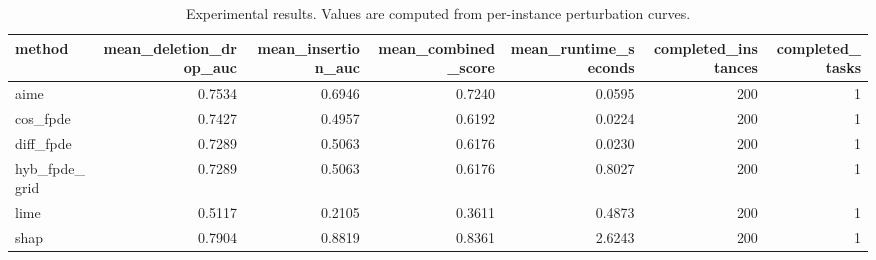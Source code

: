 \begin{table}[t]
\caption{Experimental results. Values are computed from per-instance perturbation curves.}
\label{tab:main_results_computed}
\centering
\begin{tabular}{lrrrrrr}
\toprule
method & mean\_deletion\_drop\_auc & mean\_insertion\_auc & mean\_combined\_score & mean\_runtime\_seconds & completed\_instances & completed\_tasks \\
\midrule
aime & 0.7534 & 0.6946 & 0.7240 & 0.0595 & 200 & 1 \\
cos\_fpde & 0.7427 & 0.4957 & 0.6192 & 0.0224 & 200 & 1 \\
diff\_fpde & 0.7289 & 0.5063 & 0.6176 & 0.0230 & 200 & 1 \\
hyb\_fpde\_grid & 0.7289 & 0.5063 & 0.6176 & 0.8027 & 200 & 1 \\
lime & 0.5117 & 0.2105 & 0.3611 & 0.4873 & 200 & 1 \\
shap & 0.7904 & 0.8819 & 0.8361 & 2.6243 & 200 & 1 \\
\bottomrule
\end{tabular}

\end{table}
